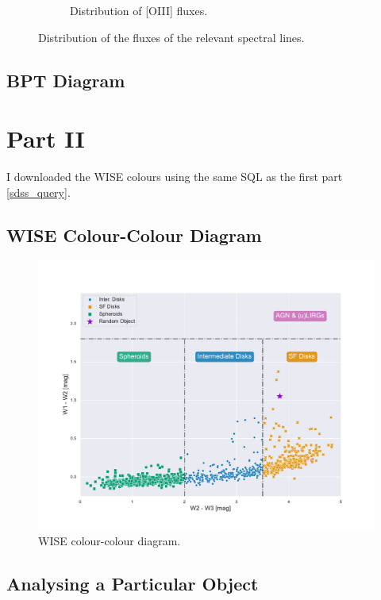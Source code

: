 \documentclass[letterpaper, oneside]{article}
\begin{document}
\begin{figure}[h]
\begin{subfigure}[b]{0.475\textwidth}
		\caption[]{Distribution of [OIII] fluxes.}
		\label{fig:distr_oiii}
	\end{subfigure}
	\caption{Distribution of the fluxes of the relevant spectral lines.} 
	\label{fig:flux_distributions}
\end{figure}

\subsection{BPT Diagram}\label{bpt_diagram_section}


\section{Part II}

I downloaded the WISE colours \cite{Wright_2010} using the same SQL as the first part \ref{sdss_query}.

\subsection{WISE Colour-Colour Diagram}

\cite{Jarrett_2017}

\begin{figure}[h]
	\centering
	\includegraphics[width=1.1\textwidth]{../wise_color_color.pdf}
	\caption{WISE colour-colour diagram.}
	\label{fig:wise_colours}
\end{figure}

\subsection{Analysing a Particular Object}






\end{document}
